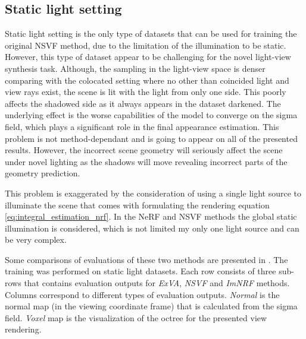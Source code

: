




\subsection{Static light setting}

Static light setting is the only type of datasets that can be used
for training the original NSVF method,
due to the limitation of the illumination to be static.
However, this type of dataset appear to be challenging for the novel light-view synthesis task.
Although, the sampling in the light-view space is denser comparing with the colocated setting
where no other than coincided light and view rays exist,
the scene is lit with the light from only one side.
This poorly affects the shadowed side as it always appears in the dataset darkened.
The underlying effect is the worse capabilities of the model to converge on the sigma field,
which plays a significant role in the final appearance estimation.
This problem is not method-dependant and is going to appear on all of the presented results.
However, the incorrect scene geometry will seriously affect the scene under novel lighting
as the shadows will move revealing incorrect parts of the geometry prediction.

This problem is exaggerated by the consideration of using a single light source to illuminate the scene
that comes with formulating the rendering equation \cref{eq:integral_estimation_nrf}.
In the NeRF and NSVF methods the global static illumination is considered,
which is not limited my only one light source and can be very complex.





Some comparisons of evaluations of these two methods are presented in .
The training was performed on static light datasets.
Each row consists of three sub-rows that contains evaluation outputs for \textit{ExVA}, \textit{NSVF} and \textit{ImNRF} methods.
Columns correspond to different types of evaluation outputs.
\textit{Normal} is the normal map (in the viewing coordinate frame)
that is calculated from the sigma field.
\textit{Voxel} map is the visualization of the octree for the presented view rendering.

